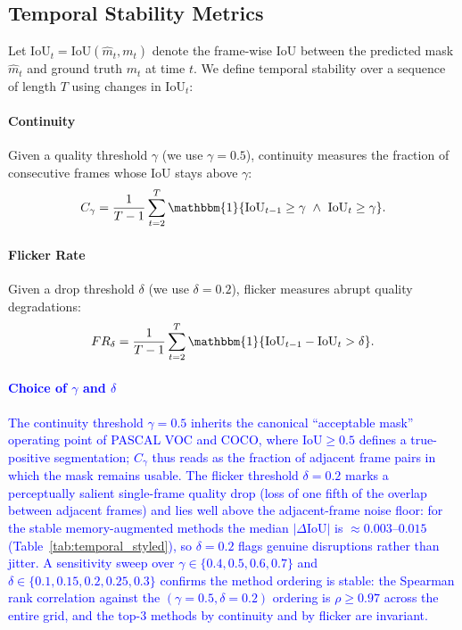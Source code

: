 \documentclass[preprint,12pt]{elsarticle}
\newcommand{\change}[1]{\textcolor{blue}{#1}}
\begin{document}
\subsection{Temporal Stability Metrics}
\label{sec:temporal_metrics}

Let $\mathrm{IoU}_t = \mathrm{IoU}(\hat m_t, m_t)$ denote the frame-wise IoU between the predicted mask $\hat m_t$ and ground truth $m_t$ at time $t$.
We define temporal stability over a sequence of length $T$ using changes in $\mathrm{IoU}_t$:

\paragraph{Continuity}
Given a quality threshold $\gamma$ (we use $\gamma=0.5$), continuity measures the fraction of consecutive frames whose IoU stays above $\gamma$:
\begin{equation}
C_\gamma = \frac{1}{T-1}\sum_{t=2}^{T} \mathbbm{1}\{\mathrm{IoU}_{t-1}\ge \gamma \ \wedge\ \mathrm{IoU}_t \ge \gamma\}.
\end{equation}

\paragraph{Flicker Rate}
Given a drop threshold $\delta$ (we use $\delta=0.2$), flicker measures abrupt quality degradations:
\begin{equation}
FR_\delta = \frac{1}{T-1}\sum_{t=2}^{T} \mathbbm{1}\{\mathrm{IoU}_{t-1} - \mathrm{IoU}_t > \delta\}.
\end{equation}

\change{\paragraph{Choice of $\gamma$ and $\delta$}
The continuity threshold $\gamma=0.5$ inherits the canonical ``acceptable mask'' operating point of PASCAL VOC and COCO, where $\mathrm{IoU}\ge 0.5$ defines a true-positive segmentation; $C_\gamma$ thus reads as the fraction of adjacent frame pairs in which the mask remains usable. The flicker threshold $\delta=0.2$ marks a perceptually salient single-frame quality drop (loss of one fifth of the overlap between adjacent frames) and lies well above the adjacent-frame noise floor: for the stable memory-augmented methods the median $|\Delta\mathrm{IoU}|$ is $\approx 0.003$--$0.015$ (Table~\ref{tab:temporal_styled}), so $\delta=0.2$ flags genuine disruptions rather than jitter. A sensitivity sweep over $\gamma\in\{0.4,0.5,0.6,0.7\}$ and $\delta\in\{0.1,0.15,0.2,0.25,0.3\}$ confirms the method ordering is stable: the Spearman rank correlation against the $(\gamma{=}0.5,\delta{=}0.2)$ ordering is $\rho\ge 0.97$ across the entire grid, and the top-3 methods by continuity and by flicker are invariant.}
\end{document}
